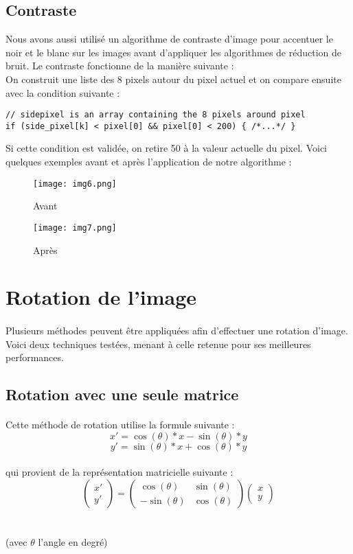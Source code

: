 \documentclass{article}
\begin{document}
\subsection{Contraste}
Nous avons aussi utilisé un algorithme de contraste d’image pour accentuer le noir et le blanc sur les images avant d’appliquer les algorithmes de réduction de bruit. Le contraste fonctionne de la manière suivante :\\
On construit une liste des 8 pixels autour du pixel actuel et on compare ensuite avec la condition suivante :
\begin{lstlisting}
// sidepixel is an array containing the 8 pixels around pixel
if (side_pixel[k] < pixel[0] && pixel[0] < 200) { /*...*/ }
\end{lstlisting}
Si cette condition est validée, on retire 50 à la valeur actuelle du pixel. 
Voici quelques exemples avant et après l’application de notre algorithme :
\begin{figure}[H]
    \centering
    \texttt{[image: img6.png]}
    \caption{Avant}
    \texttt{[image: img7.png]}
    \caption{Après}
\end{figure}

\newpage
\section{Rotation de l'image}
\paragraph{}
Plusieurs méthodes peuvent être appliquées afin d’effectuer une rotation d’image. Voici deux techniques testées, menant à celle retenue pour ses meilleures performances.

\subsection{Rotation avec une seule matrice}
\paragraph{}
Cette méthode de rotation utilise la formule suivante :
$$
x' = \cos(\theta) * x - \sin(\theta) * y
$$
$$
y' = \sin(\theta) * x + \cos(\theta) * y
$$
\paragraph{}
qui provient de la représentation matricielle suivante :\\
$$\left( \begin{array}{cc} x' \\ y'\end{array}\right) = \left( \begin{array}{cc} \cos(\theta) & \sin(\theta) \\ -\sin(\theta) & \cos(\theta) \end{array}\right)\left(\begin{array}{cc} x \\ y\end{array}\right)$$ 
\\\\
(avec \(\theta\) l’angle en degré)
\end{document}

